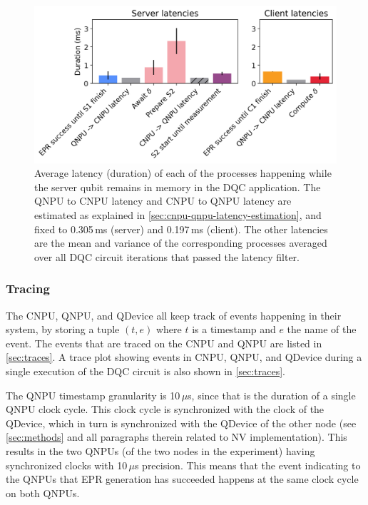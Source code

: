 \begin{figure}[htbp]
\centering
\includegraphics[width=0.8\linewidth]{figures/qnodeos/supplementary/plots/latencies_variance.png}
\caption{Average latency (duration) of each of the processes happening while the server qubit remains in memory in the \ac{DQC} application. The \ac{QNPU} to \ac{CNPU} latency and \ac{CNPU} to \ac{QNPU} latency are estimated as explained in \cref{sec:cnpu-qnpu-latency-estimation}, and fixed to 0.305\,ms (server) and 0.197\,ms (client). The other latencies are the mean and variance of the corresponding processes averaged over all \ac{DQC} circuit iterations that passed the latency filter.}
\label{fig:delcomp-latencies-variance}
\end{figure}

\subsubsection{Tracing}

The \ac{CNPU}, \ac{QNPU}, and \ac{QDevice} all keep track of events happening in their system, by storing a tuple $(t, e)$ where $t$ is a timestamp and $e$ the name of the event. The events that are traced on the \ac{CNPU} and \ac{QNPU} are listed in \cref{sec:traces}. A trace plot showing events in \ac{CNPU}, \ac{QNPU}, and \ac{QDevice} during a single execution of the \ac{DQC} circuit is also shown in \cref{sec:traces}.

The \ac{QNPU} timestamp granularity is 10\,$\mu$s, since that is the duration of a single \ac{QNPU} clock cycle. This clock cycle is synchronized with the clock of the \ac{QDevice}, which in turn is synchronized with the \ac{QDevice} of the other node (see \cref{sec:methods} and all paragraphs therein related to \ac{NV} implementation). This results in the two \acp{QNPU} (of the two nodes in the experiment) having synchronized clocks with 10\,$\mu$s precision. This means that the event indicating to the \acp{QNPU} that \ac{EPR} generation has succeeded happens at the same clock cycle on both \acp{QNPU}.


